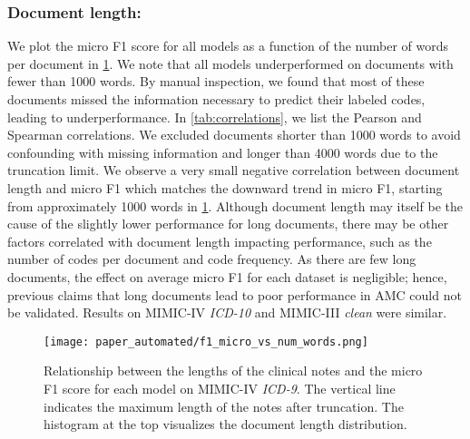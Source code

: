 {\subsubsection{Document length:}\label{subsubsec:document-length}

We plot the micro F1 score for all models as a function of the number of words per document in \cref{fig:text_length}. 
We note that all models underperformed on documents with fewer than 1000 words. 
By manual inspection, we found that most of these documents missed the information necessary to predict their labeled codes, leading to underperformance. 
In \cref{tab:correlations}, we list the Pearson and Spearman correlations. We excluded documents shorter than 1000 words to avoid confounding with missing information and longer than 4000 words due to the truncation limit. We observe a very small negative correlation between document length and micro F1 which matches the downward trend in micro F1, starting from approximately 1000 words in \cref{fig:text_length}. 
Although document length may itself be the cause of the slightly lower performance for long documents, there may be other factors correlated with document length impacting performance, such as the number of codes per document and code frequency.
As there are few long documents, the effect on average micro F1 for each dataset is negligible; hence, previous claims that long documents lead to poor performance in AMC could not be validated. Results on MIMIC-IV \textit{ICD-10} and MIMIC-III \textit{clean} were similar.

\begin{figure}[t]
    \centering
    \texttt{[image: paper\_automated/f1\_micro\_vs\_num\_words.png]}
    \caption[Relationship between the lengths of the clinical notes and the micro F1 score for each model on MIMIC-IV \textit{ICD-9}]{Relationship between the lengths of the clinical notes and the micro F1 score for each model on MIMIC-IV \textit{ICD-9}. The vertical line indicates the maximum length of the notes after truncation. The histogram at the top visualizes the document length distribution.}
    \label{fig:text_length}
\end{figure}

}
